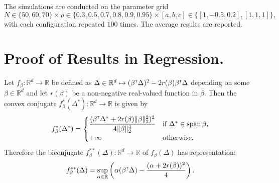 \documentclass[12pt]{article}
\begin{document}
The simulations are conducted on the parameter grid $$N \in \{50, 60, 70\} \times \rho \in \{0.3, 0.5, 0.7, 0.8, 0.9, 0.95\} \times [a,b,c] \in \{[1,-0.5,0.2],[1,1,1]\},$$ with each configuration repeated $100$ times. The average results are reported.


\section{Proof of Results in Regression.}
\begin{lemma}
\label{lem:1}
    Let $f_\beta:\mathbb{R}^d \to \mathbb{R}$ be defined as $\Delta\in\mathbb{R}^d \mapsto (\beta^{\scriptscriptstyle \sf T} \Delta)^2 - 2r(\beta)\beta^{\scriptscriptstyle \sf T} \Delta$ depending on some $\beta \in \mathbb{R}^d$ and let $r(\beta)$ be a non-negative real-valued function in $\beta$. Then the convex conjugate $f_\beta^*(\Delta^*):\mathbb{R}^d\to\mathbb{R}$ is given by \[
    f_\beta^*(\Delta^*) = \begin{cases}
        \dfrac{(\beta^{\scriptscriptstyle \sf T} \Delta^* + 2r(\beta)\lVert \beta \rVert_2^2)^2}{4\lVert \beta\rVert_2^4} & \text{if } \Delta^* \in \operatorname{span}{\beta},\\
        +\infty & \text{otherwise}.
    \end{cases}
    \]Therefore the biconjugate $f_\beta^{**}(\Delta):\mathbb{R}^d\to \mathbb{R}$ of $f_\beta(\Delta)$ has representation:
    \[
    f_\beta^{**}(\Delta) = \sup_{\alpha\in \mathbb{R}} \left(\alpha (\beta^{\scriptscriptstyle \sf T}\Delta) - \dfrac{(\alpha+2r(\beta))^2}{4}\right).
    \]
\end{lemma}
\end{document}
